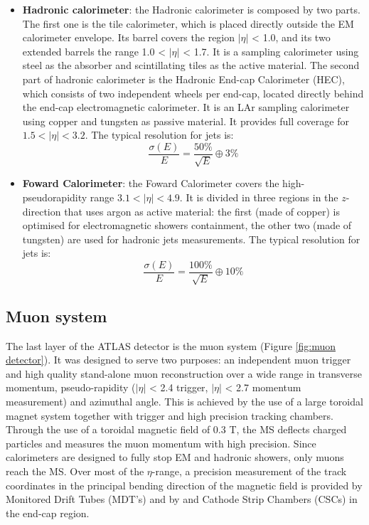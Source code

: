 \documentclass[a4paper, oneside, 11pt, openright]{book}
\begin{document}
\begin{itemize}
					\item \textbf{Hadronic calorimeter}: the Hadronic calorimeter \cite{TileCalo_report} is composed by two parts. The first one is the tile calorimeter, which is placed directly outside the EM calorimeter envelope. Its barrel covers the region $|\eta|$ < 1.0, and its two extended barrels the range 1.0 < $|\eta|$ < 1.7. It is a sampling calorimeter using steel as the absorber and scintillating tiles as the active material. The second part of hadronic calorimeter is the Hadronic End-cap Calorimeter (HEC), which consists of two independent wheels per end-cap, located directly behind the end-cap electromagnetic calorimeter. It is an LAr sampling calorimeter using copper and tungsten as passive material. It provides full coverage for $1.5<|\eta|<3.2$. The typical resolution for jets is:
					$$ 
					\frac{\sigma(E)}{E} = \frac{50\%}{\sqrt{E}} \oplus 3\%
					$$
					
					\item \textbf{Foward Calorimeter}: the Foward Calorimeter \cite{FowardCalo_report} covers the high-pseudorapidity range $3.1 < |\eta| < 4.9$. It is divided in three regions in the $z$-direction that uses argon as active material: the first (made of copper) is optimised for electromagnetic showers containment, the other two (made of tungsten) are used for hadronic jets measurements. The typical resolution for jets is:
					$$ 
					\frac{\sigma(E)}{E} = \frac{100\%}{\sqrt{E}} \oplus 10\%
					$$
				\end{itemize}
			\subsection{Muon system}
				The last layer of the ATLAS detector is the muon system	\cite{muon_report} (Figure \ref{fig:muon detector}). It was designed to serve two purposes: an independent muon trigger and high quality stand-alone muon reconstruction over a wide range in transverse momentum, pseudo-rapidity ($|\eta|$ < 2.4 trigger, $|\eta|$ < 2.7 momentum measurement) and azimuthal angle. This is achieved by the use of a large toroidal magnet system together with trigger and high precision tracking chambers. Through the use of a toroidal magnetic field of 0.3 T, the MS deflects charged particles and measures the muon momentum with high precision. Since calorimeters are designed to fully stop EM and hadronic showers, only muons reach the MS. Over most of the $\eta$-range, a precision measurement of the track coordinates in the principal bending direction of the magnetic field is provided by Monitored Drift Tubes (MDT’s) and by and Cathode Strip Chambers (CSCs) in the end-cap region. 
				
\end{document}
